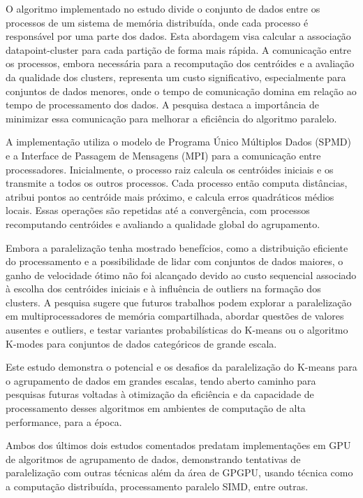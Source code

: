 \documentclass[12pt,
openright, 
oneside, %
a4paper,    %
brazil]{facom-ufu-abntex2}
\begin{document}
O algoritmo implementado no estudo divide o conjunto de dados entre os processos de um sistema de memória distribuída, onde cada processo é responsável por uma parte dos dados. Esta abordagem visa calcular a associação datapoint-cluster para cada partição de forma mais rápida. A comunicação entre os processos, embora necessária para a recomputação dos centróides e a avaliação da qualidade dos clusters, representa um custo significativo, especialmente para conjuntos de dados menores, onde o tempo de comunicação domina em relação ao tempo de processamento dos dados. A pesquisa destaca a importância de minimizar essa comunicação para melhorar a eficiência do algoritmo paralelo.

A implementação utiliza o modelo de Programa Único Múltiplos Dados (SPMD) e a Interface de Passagem de Mensagens (MPI) para a comunicação entre processadores. Inicialmente, o processo raiz calcula os centróides iniciais e os transmite a todos os outros processos. Cada processo então computa distâncias, atribui pontos ao centróide mais próximo, e calcula erros quadráticos médios locais. Essas operações são repetidas até a convergência, com processos recomputando centróides e avaliando a qualidade global do agrupamento.

Embora a paralelização tenha mostrado benefícios, como a distribuição eficiente do processamento e a possibilidade de lidar com conjuntos de dados maiores, o ganho de velocidade ótimo não foi alcançado devido ao custo sequencial associado à escolha dos centróides iniciais e à influência de outliers na formação dos clusters. A pesquisa sugere que futuros trabalhos podem explorar a paralelização em multiprocessadores de memória compartilhada, abordar questões de valores ausentes e outliers, e testar variantes probabilísticas do K-means ou o algoritmo K-modes para conjuntos de dados categóricos de grande escala.

Este estudo demonstra o potencial e os desafios da paralelização do K-means para o agrupamento de dados em grandes escalas, tendo aberto caminho para pesquisas futuras voltadas à otimização da eficiência e da capacidade de processamento desses algoritmos em ambientes de computação de alta performance, para a época.

Ambos dos últimos dois estudos comentados predatam implementações em GPU de algoritmos de agrupamento de dados, demonstrando tentativas de paralelização com outras técnicas além da área de GPGPU, usando técnica como a computação distribuída, processamento paralelo SIMD, entre outras.
\end{document}
